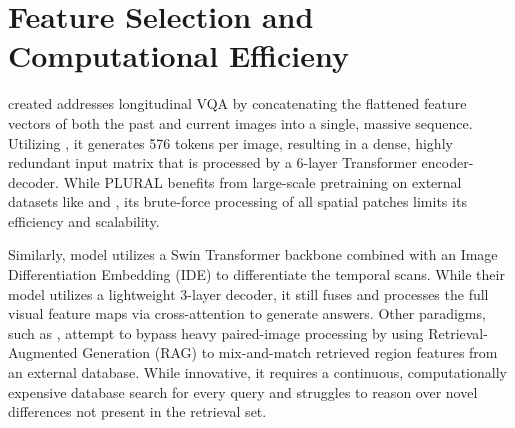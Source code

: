 \section{Feature Selection and Computational Efficieny}
\cite{plural} created addresses longitudinal VQA by concatenating the flattened feature vectors of both the past and current images into a single, massive sequence. Utilizing \cite{resnet101}, it generates 576 tokens per image, resulting in a dense, highly redundant input matrix that is processed by a 6-layer Transformer encoder-decoder. While PLURAL benefits from large-scale pretraining on external datasets like \cite{mimic-cxr} and \cite{MS-COCO}, its brute-force processing of all spatial patches limits its efficiency and scalability.

Similarly, \cite{encoder-decoder} model utilizes a Swin Transformer backbone combined with an Image Differentiation Embedding (IDE) to differentiate the temporal scans. While their model utilizes a lightweight 3-layer decoder, it still fuses and processes the full visual feature maps via cross-attention to generate answers. Other paradigms, such as \cite{regiomix}, attempt to bypass heavy paired-image processing by using Retrieval-Augmented Generation (RAG) to mix-and-match retrieved region features from an external database. While innovative, it requires a continuous, computationally expensive database search for every query and struggles to reason over novel differences not present in the retrieval set.



